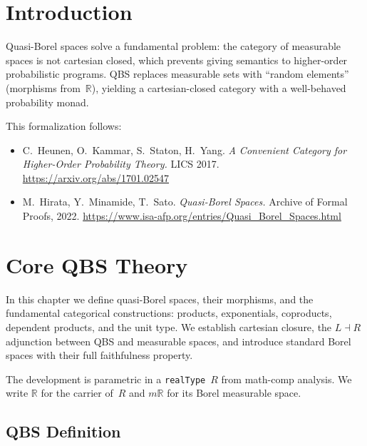 %

\chapter*{Introduction}

Quasi-Borel spaces solve a fundamental problem: the category of
measurable spaces is not cartesian closed, which prevents giving
semantics to higher-order probabilistic programs. QBS replaces
measurable sets with ``random elements'' (morphisms from~$\mathbb{R}$),
yielding a cartesian-closed category with a well-behaved probability
monad.

This formalization follows:
\begin{itemize}
\item C.~Heunen, O.~Kammar, S.~Staton, H.~Yang.
  \emph{A Convenient Category for Higher-Order Probability Theory.}
  LICS 2017.
  \url{https://arxiv.org/abs/1701.02547}
\item M.~Hirata, Y.~Minamide, T.~Sato.
  \emph{Quasi-Borel Spaces.}
  Archive of Formal Proofs, 2022.
  \url{https://www.isa-afp.org/entries/Quasi_Borel_Spaces.html}
\end{itemize}

\chapter{Core QBS Theory}\label{ch:core}

In this chapter we define quasi-Borel spaces, their morphisms, and
the fundamental categorical constructions: products, exponentials,
coproducts, dependent products, and the unit type.
We establish cartesian closure, the $L \dashv R$ adjunction between
QBS and measurable spaces, and introduce standard Borel spaces
with their full faithfulness property.

The development is parametric in a \texttt{realType}~$R$ from math-comp
analysis. We write $\mathbb{R}$ for the carrier of~$R$ and
$m\mathbb{R}$ for its Borel measurable space.

\section{QBS Definition}

